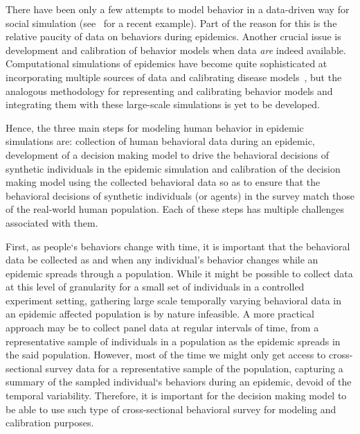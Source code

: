 \documentclass[doublespace,draft]{VTthesis}
\begin{document}
    There have been only a few attempts to model behavior in a data-driven way for social simulation (see~\cite{pynadath16behavior} for a recent example). Part of the reason for this is the relative paucity of data on behaviors during epidemics. Another crucial issue is development and calibration of behavior models when data \emph{are} indeed available. Computational simulations of epidemics have become quite sophisticated at incorporating multiple sources of data and calibrating disease models~\cite{EG+04}, but the analogous methodology for representing and calibrating behavior models and integrating them with these large-scale simulations is yet to be developed.
    
    Hence, the three main steps for modeling human behavior in epidemic simulations are: collection of human behavioral data during an epidemic, development of a decision making model to drive the behavioral decisions of synthetic individuals in the epidemic simulation and calibration of the decision making model using the collected behavioral data so as to ensure that the behavioral decisions of synthetic individuals (or agents) in the survey match those of the real-world human population. Each of these steps has multiple challenges associated with them. 
    
    First, as people`s behaviors change with time, it is important that the behavioral data be collected as and when any individual's behavior changes while an epidemic spreads through a population. While it might be possible to collect data at this level of granularity for a small set of individuals in a controlled experiment setting, gathering large scale temporally varying behavioral data in an epidemic affected population is by nature infeasible. A more practical approach may be to collect panel data at regular intervals of time, from a representative sample of individuals in a population as the epidemic spreads in the said population. However, most of the time we might only get access to cross-sectional survey data for a representative sample of the population, capturing a summary of the sampled individual`s behaviors during an epidemic, devoid of the temporal variability. Therefore, it is important for the decision making model to be able to use such type of cross-sectional behavioral survey for modeling and calibration purposes. 
    
\end{document}
